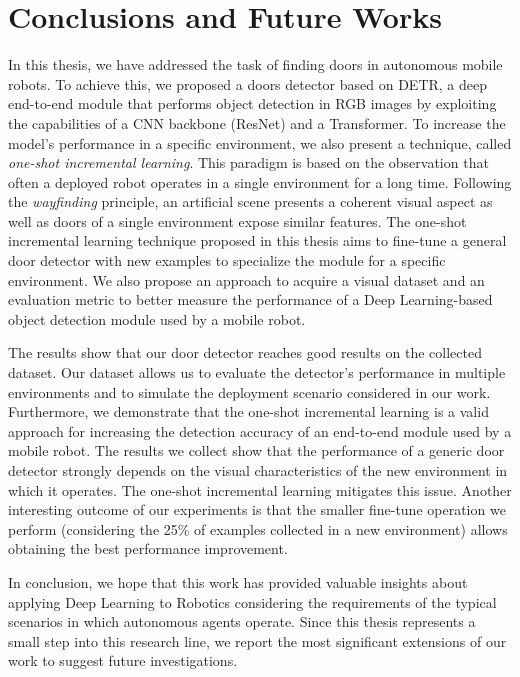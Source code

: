 \chapter{Conclusions and Future Works}
\label{sec:chapter6}
\thispagestyle{empty}

In this thesis, we have addressed the task of finding doors in autonomous mobile robots. To achieve this, we proposed a doors detector based on DETR, a deep end-to-end module that performs object detection in RGB images by exploiting the capabilities of a CNN backbone (ResNet) and a Transformer. To increase the model's performance in a specific environment, we also present a technique, called \textit{one-shot incremental learning}. This paradigm is based on the observation that often a deployed robot operates in a single environment for a long time. Following the \textit{wayfinding} principle, an artificial scene presents a coherent visual aspect as well as doors of a single environment expose similar features. The one-shot incremental learning technique proposed in this thesis aims to fine-tune a general door detector with new examples to specialize the module for a specific environment. We also propose an approach to acquire a visual dataset and an evaluation metric to better measure the performance of a Deep Learning-based object detection module used by a mobile robot. 

The results show that our door detector reaches good results on the collected dataset. Our dataset allows us to evaluate the detector's performance in multiple environments and to simulate the deployment scenario considered in our work. Furthermore, we demonstrate that the one-shot incremental learning is a valid approach for increasing the detection accuracy of an end-to-end module used by a mobile robot. The results we collect show that the performance of a generic door detector strongly depends on the visual characteristics of the new environment in which it operates. The one-shot incremental learning mitigates this issue. Another interesting outcome of our experiments is that the smaller fine-tune operation we perform (considering the 25\% of examples collected in a new environment) allows obtaining the best performance improvement. 

In conclusion, we hope that this work has provided valuable insights about applying Deep Learning to Robotics considering the requirements of the typical scenarios in which autonomous agents operate. Since this thesis represents a small step into this research line, we report the most significant extensions of our work to suggest future investigations.

